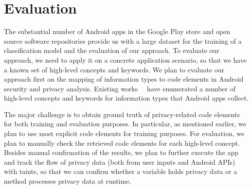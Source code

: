 \section{Evaluation}

The substantial number of Android apps in the Google Play store and open source software repositories provide us with a large dataset for the training of a classification model and the evaluation of our approach. To evaluate our approach, we need to apply it on a concrete application scenario, so that we have a known set of high-level concepts and keywords. We plan to evaluate our approach first on the mapping of information types to code elements in Android security and privacy analysis. Existing works~\cite{rasthofer2014machine}~\cite{huang2015supor} have enumerated a number of high-level concepts and keywords for information types that Android apps collect. 

The major challenge is to obtain ground truth of privacy-related code elements for both training and evaluation purposes. In particular, as mentioned earlier, we plan to use most explicit code elements for training purposes. For evaluation, we plan to manually check the retrieved code elements for each high-level concept. Besides manual confirmation of the results, we plan to further execute the app and track the flow of privacy data (both from user inputs and Android APIs) with taints, so that we can confirm whether a variable holds privacy data or a method processes privacy data at runtime.

